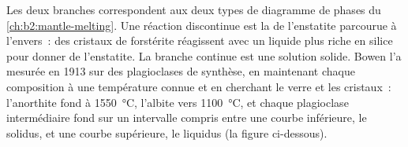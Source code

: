 Les deux branches correspondent aux deux types de diagramme de phases du
\cref{ch:b2:mantle-melting}. Une réaction discontinue est la  de l'enstatite
parcourue à l'envers~: des cristaux de forstérite réagissent avec un liquide plus riche en silice
pour donner de l'enstatite. La branche continue est une solution solide. Bowen l'a mesurée en 1913
sur des plagioclases de synthèse, en maintenant chaque composition à une température connue et en
cherchant le verre et les cristaux~: l'anorthite fond à \qty{1550}{\celsius}, l'albite vers
\qty{1100}{\celsius}, et chaque plagioclase intermédiaire fond sur un intervalle compris
entre une courbe inférieure, le solidus, et une courbe supérieure, le liquidus (la figure
ci-dessous).

